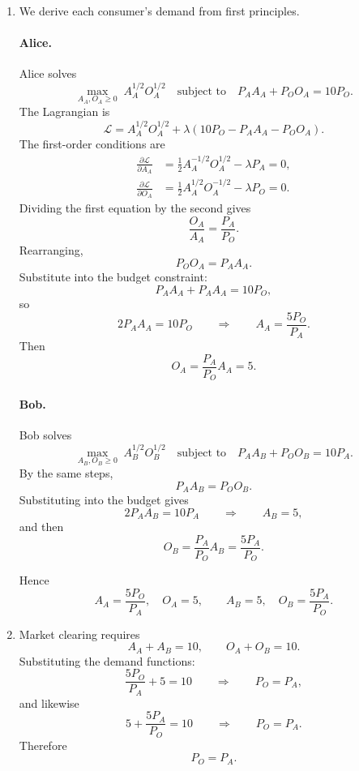 \documentclass[12pt]{article}
\begin{document}
\begin{enumerate}[label=(\alph*)]
    \item
    We derive each consumer's demand from first principles.

    \paragraph{Alice.}
    Alice solves
    \[
    \max_{A_A,O_A\ge 0}\; A_A^{1/2}O_A^{1/2}
    \quad\text{subject to}\quad
    P_AA_A+P_OO_A=10P_O.
    \]
    The Lagrangian is
    \[
    \mathcal L=A_A^{1/2}O_A^{1/2}+\lambda(10P_O-P_AA_A-P_OO_A).
    \]
    The first-order conditions are
    \begin{align*}
        \frac{\partial\mathcal L}{\partial A_A}
        &=\frac12 A_A^{-1/2}O_A^{1/2}-\lambda P_A=0,\\
        \frac{\partial\mathcal L}{\partial O_A}
        &=\frac12 A_A^{1/2}O_A^{-1/2}-\lambda P_O=0.
    \end{align*}
    Dividing the first equation by the second gives
    \[
    \frac{O_A}{A_A}=\frac{P_A}{P_O}.
    \]
    Rearranging,
    \[
    P_OO_A=P_AA_A.
    \]
    Substitute into the budget constraint:
    \[
    P_AA_A+P_AA_A=10P_O,
    \]
    so
    \[
    2P_AA_A=10P_O
    \qquad\Longrightarrow\qquad
    A_A=\frac{5P_O}{P_A}.
    \]
    Then
    \[
    O_A=\frac{P_A}{P_O}A_A=5.
    \]

    \paragraph{Bob.}
    Bob solves
    \[
    \max_{A_B,O_B\ge 0}\; A_B^{1/2}O_B^{1/2}
    \quad\text{subject to}\quad
    P_AA_B+P_OO_B=10P_A.
    \]
    By the same steps,
    \[
    P_AA_B=P_OO_B.
    \]
    Substituting into the budget gives
    \[
    2P_AA_B=10P_A
    \qquad\Longrightarrow\qquad
    A_B=5,
    \]
    and then
    \[
    O_B=\frac{P_A}{P_O}A_B=\frac{5P_A}{P_O}.
    \]

    Hence
    \[
    \boxed{
    A_A=\frac{5P_O}{P_A},\quad O_A=5,\qquad A_B=5,\quad O_B=\frac{5P_A}{P_O}.}
    \]

    \item
    Market clearing requires
    \[
    A_A+A_B=10,\qquad O_A+O_B=10.
    \]
    Substituting the demand functions:
    \[
    \frac{5P_O}{P_A}+5=10
    \qquad\Longrightarrow\qquad
    P_O=P_A,
    \]
    and likewise
    \[
    5+\frac{5P_A}{P_O}=10
    \qquad\Longrightarrow\qquad
    P_O=P_A.
    \]
    Therefore
    \[
    \boxed{P_O=P_A.}
    \]


\end{enumerate}
\end{document}

